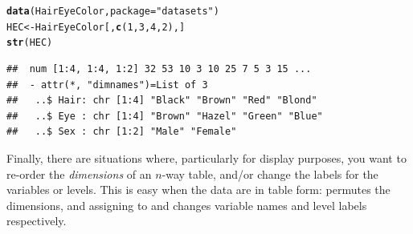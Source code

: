 \documentclass[11pt]{book}\usepackage[]{graphicx}\usepackage[]{color}
\makeatletter
\newcommand{\hlnum}[1]{\textcolor[rgb]{0.686,0.059,0.569}{#1}}%
\newcommand{\hlstr}[1]{\textcolor[rgb]{0.192,0.494,0.8}{#1}}%
\newcommand{\hlstd}[1]{\textcolor[rgb]{0.345,0.345,0.345}{#1}}%
\newcommand{\hlkwb}[1]{\textcolor[rgb]{0.69,0.353,0.396}{#1}}%
\newcommand{\hlkwc}[1]{\textcolor[rgb]{0.333,0.667,0.333}{#1}}%
\newcommand{\hlkwd}[1]{\textcolor[rgb]{0.737,0.353,0.396}{\textbf{#1}}}%
\newenvironment{kframe}{%
 \def\at@end@of@kframe{}%
 \ifinner\ifhmode%
  \def\at@end@of@kframe{\end{minipage}}%
  \begin{minipage}{\columnwidth}%
 \fi\fi%
 \def\FrameCommand##1{\hskip\@totalleftmargin \hskip-\fboxsep
 \colorbox{shadecolor}{##1}\hskip-\fboxsep
     \hskip-\linewidth \hskip-\@totalleftmargin \hskip\columnwidth}%
 \MakeFramed {\advance\hsize-\width
   \@totalleftmargin\z@ \linewidth\hsize
   \@setminipage}}%
 {\par\unskip\endMakeFramed%
 \at@end@of@kframe}
\newenvironment{knitrout}{}{} %
\renewenvironment{knitrout}{\small\renewcommand{\baselinestretch}{.85}}{} %
\makeatother
\begin{document}
\begin{knitrout}
\color{fgcolor}\begin{kframe}
\begin{alltt}
\hlkwd{data}\hlstd{(HairEyeColor,} \hlkwc{package}\hlstd{=}\hlstr{"datasets"}\hlstd{)}
\hlstd{HEC} \hlkwb{<-} \hlstd{HairEyeColor[,} \hlkwd{c}\hlstd{(}\hlnum{1}\hlstd{,}\hlnum{3}\hlstd{,}\hlnum{4}\hlstd{,}\hlnum{2}\hlstd{), ]}
\hlkwd{str}\hlstd{(HEC)}
\end{alltt}
\begin{verbatim}
##  num [1:4, 1:4, 1:2] 32 53 10 3 10 25 7 5 3 15 ...
##  - attr(*, "dimnames")=List of 3
##   ..$ Hair: chr [1:4] "Black" "Brown" "Red" "Blond"
##   ..$ Eye : chr [1:4] "Brown" "Hazel" "Green" "Blue"
##   ..$ Sex : chr [1:2] "Male" "Female"
\end{verbatim}
\end{kframe}
\end{knitrout}


Finally, there are situations where, particularly for display purposes, you
want to re-order the \emph{dimensions} of an $n$-way table, and/or change the
labels for the variables or levels.
This is easy when the data are in table form:  permutes
the dimensions, and assigning to  and 
changes variable names and level labels respectively.
\end{document}
